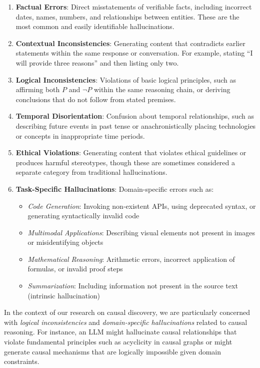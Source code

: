 \begin{enumerate}
    \item \textbf{Factual Errors}: Direct misstatements of verifiable facts, including incorrect dates, names, numbers, and relationships between entities. These are the most common and easily identifiable hallucinations.
    
    \item \textbf{Contextual Inconsistencies}: Generating content that contradicts earlier statements within the same response or conversation. For example, stating ``I will provide three reasons'' and then listing only two.
    
    \item \textbf{Logical Inconsistencies}: Violations of basic logical principles, such as affirming both $P$ and $\neg P$ within the same reasoning chain, or deriving conclusions that do not follow from stated premises.
    
    \item \textbf{Temporal Disorientation}: Confusion about temporal relationships, such as describing future events in past tense or anachronistically placing technologies or concepts in inappropriate time periods.
    
    \item \textbf{Ethical Violations}: Generating content that violates ethical guidelines or produces harmful stereotypes, though these are sometimes considered a separate category from traditional hallucinations.
    
    \item \textbf{Task-Specific Hallucinations}: Domain-specific errors such as:
    \begin{itemize}
        \item \textit{Code Generation}: Invoking non-existent APIs, using deprecated syntax, or generating syntactically invalid code
        \item \textit{Multimodal Applications}: Describing visual elements not present in images or misidentifying objects
        \item \textit{Mathematical Reasoning}: Arithmetic errors, incorrect application of formulas, or invalid proof steps
        \item \textit{Summarization}: Including information not present in the source text (intrinsic hallucination)
    \end{itemize}
\end{enumerate}

In the context of our research on causal discovery, we are particularly concerned with \textit{logical inconsistencies} and \textit{domain-specific hallucinations} related to causal reasoning. For instance, an LLM might hallucinate causal relationships that violate fundamental principles such as acyclicity in causal graphs or might generate causal mechanisms that are logically impossible given domain constraints.


